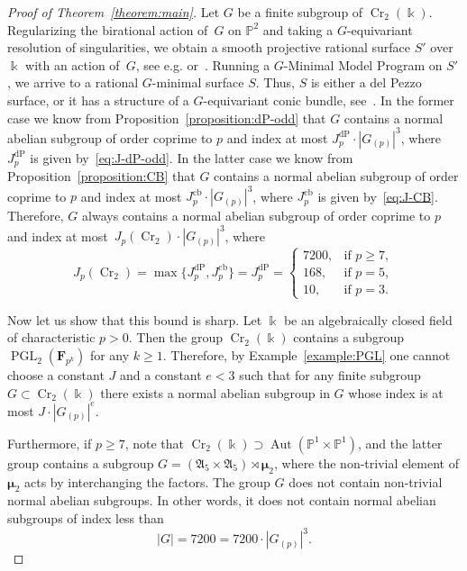 \documentclass[12pt]{amsart}
\numberwithin{equation}{section}
\theoremstyle{definition}
\newcommand{\mumu}{\boldsymbol{\mu}}
\newcommand{\PP}{\mathbb P}
\DeclareMathOperator{\Cr}{Cr}
\DeclareMathOperator{\Aut}{Aut}
\DeclareMathOperator{\PGL}{PGL}
\def \ge {\geqslant}
\begin{document}
\begin{proof}[Proof of Theorem~\ref{theorem:main}]
Let $G$ be a finite subgroup of $\Cr_2(\Bbbk)$.
Regularizing the birational action of~$G$ on $\PP^2$ and
taking a $G$-equivariant resolution
of singularities, we obtain a smooth projective rational surface $S'$ over $\Bbbk$
with an action of~$G$, see e.g. \cite[Lemma~14.1.1]{P:G-MMP} or~\mbox{\cite[Lemma~3.6]{ChenShramov}}.
Running a $G$-Minimal Model Program on $S'$, we arrive to a rational $G$-minimal surface $S$.
Thus, $S$ is either a del Pezzo surface, or it has a structure of a $G$-equivariant conic bundle, see~\mbox{\cite[Theorem~1G]{Iskovskikh80}}.
In the former case we know from Proposition~\ref{proposition:dP-odd}
that $G$ contains a normal abelian subgroup of order coprime to $p$
and index at most
$J_p^{\mathrm{dP}}\cdot |G_{(p)}|^3$, where $J_p^{\mathrm{dP}}$ is given by~\eqref{eq:J-dP-odd}.
In the latter case we know from Proposition~\ref{proposition:CB}
that $G$ contains a normal abelian subgroup of order coprime to $p$
and index at most
$J_p^{\mathrm{cb}}\cdot |G_{(p)}|^3$, where $J_p^{\mathrm{cb}}$ is given by~\eqref{eq:J-CB}.
Therefore, $G$ always contains a normal abelian subgroup of order coprime to $p$
and index at most~\mbox{$J_p(\Cr_2)\cdot |G_{(p)}|^{3}$},
where
$$
J_p(\Cr_2)=\max\{J_p^{\mathrm{dP}}, J_p^{\mathrm{cb}}\}=J_p^{\mathrm{dP}}=
\begin{cases}
7200, &\text{if\ } p\ge 7,\\
168, &\text{if\ } p=5,\\
10, &\text{if\ } p=3.
\end{cases}
$$

Now let us show that this bound is sharp.
Let $\Bbbk$ be an algebraically closed field of characteristic $p>0$.
Then the group $\Cr_2(\Bbbk)$ contains a subgroup $\PGL_2(\mathbf{F}_{p^k})$
for any $k\ge 1$. Therefore, by Example~\ref{example:PGL}
one cannot choose a constant $J$ and a constant $e<3$
such that for any finite subgroup
$G\subset \Cr_2(\Bbbk)$ there exists a normal abelian
subgroup in $G$ whose index is at most $J\cdot |G_{(p)}|^e$.

Furthermore, if $p\ge 7$, note that
$\Cr_2(\Bbbk)\supset\Aut(\PP^1\times\PP^1)$, and the latter group contains
a subgroup $G=(\mathfrak{A}_5\times\mathfrak{A}_5)\rtimes\mumu_2$,
where the non-trivial element of $\mumu_2$ acts by interchanging the factors.
The group $G$ does not contain
non-trivial normal abelian subgroups. In other words, it does not contain normal
abelian subgroups of index less than
$$
|G|=7200=7200\cdot |G_{(p)}|^3.
$$


\end{proof}
\end{document}
